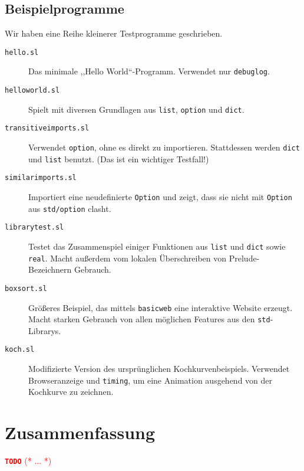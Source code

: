 \documentclass[runningheads]{llncs}
\newcommand{\TODO}[1]{ \textcolor{red}{\textbf{\texttt{\large{TODO}}} (* #1 *)}\par}
\begin{document}
\subsection{Beispielprogramme}

Wir haben eine Reihe kleinerer Testprogramme geschrieben.

\begin{description}
 \item[\texttt{hello.sl}] Das minimale ,,Hello World``-Programm. Verwendet
   nur \verb|debuglog|.
 \item[\texttt{helloworld.sl}] Spielt mit diversen Grundlagen aus \verb|list|,
   \verb|option| und \verb|dict|.
 \item[\texttt{transitiveimports.sl}] Verwendet \verb|option|, ohne es direkt
   zu importieren. Stattdessen werden \verb|dict| und \verb|list| benutzt.
   (Das ist ein wichtiger Testfall!)
 \item[\texttt{similarimports.sl}] Importiert eine neudefinierte \verb|Option|
   und zeigt, dass sie nicht mit \verb|Option| aus \verb|std/option| clasht.
 \item[\texttt{librarytest.sl}] Testet das Zusammenspiel einiger Funktionen aus
   \verb|list| und \verb|dict| sowie \verb|real|. Macht außerdem vom lokalen
   Überschreiben von Prelude-Bezeichnern Gebrauch.
 \item[\texttt{boxsort.sl}] Größeres Beispiel, das mittels \verb|basicweb| eine
   interaktive Website erzeugt. Macht starken Gebrauch von allen möglichen
   Features aus den \verb|std|-Librarys.
 \item[\texttt{koch.sl}] Modifizierte Version des ursprünglichen
   Kochkurvenbeispiels. Verwendet Browseranzeige und \verb|timing|, um eine
   Animation ausgehend von der Kochkurve zu zeichnen.
\end{description}

\section{Zusammenfassung}

\TODO{...}
\end{document}
